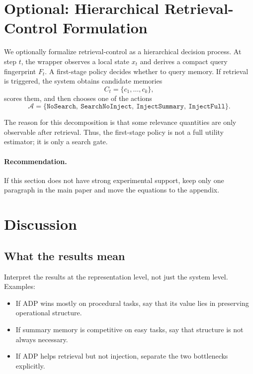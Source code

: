 \documentclass{article}
\newcommand{\ADP}{\textsc{ADP}}
\begin{document}
\section{Optional: Hierarchical Retrieval-Control Formulation}

We optionally formalize retrieval-control as a hierarchical decision process.
At step $t$, the wrapper observes a local state $x_t$ and derives a compact query fingerprint $F_t$.
A first-stage policy decides whether to query memory.
If retrieval is triggered, the system obtains candidate memories
\[
C_t = \{c_1,\dots,c_k\},
\]
scores them, and then chooses one of the actions
\[
\mathcal{A} = \{\texttt{NoSearch},\ \texttt{SearchNoInject},\ \texttt{InjectSummary},\ \texttt{InjectFull}\}.
\]

The reason for this decomposition is that some relevance quantities are only observable after retrieval.
Thus, the first-stage policy is not a full utility estimator; it is only a search gate.

\paragraph{Recommendation.}
If this section does not have strong experimental support, keep only one paragraph in the main paper and
move the equations to the appendix.

\section{Discussion}

\subsection{What the results mean}
Interpret the results at the representation level, not just the system level.
Examples:
\begin{itemize}[leftmargin=*,itemsep=2pt,topsep=2pt]
    \item If \ADP{} wins mostly on procedural tasks, say that its value lies in preserving operational structure.
    \item If summary memory is competitive on easy tasks, say that structure is not always necessary.
    \item If \ADP{} helps retrieval but not injection, separate the two bottlenecks explicitly.
\end{itemize}
\end{document}
